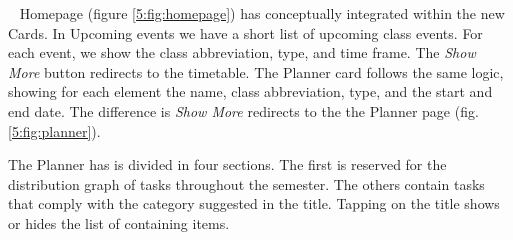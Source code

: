 ~
Homepage (figure \ref{5:fig:homepage}) has conceptually integrated within the new Cards. In Upcoming events we have a short list of upcoming class events. For each event, we show the class abbreviation, type, and time frame. The \textit{Show More} button redirects to the timetable.
The Planner card follows the same logic, showing for each element the name, class abbreviation, type, and the start and end date. The difference is \textit{Show More} redirects to the the Planner page (fig. \ref{5:fig:planner}).

The Planner has is divided in four sections. The first is reserved for the distribution graph of tasks throughout the semester. The others contain tasks that comply with the category suggested in the title. Tapping on the title shows or hides the list of containing items.
~
\begin{figure}[!ht]
    \centering
    \begin{minipage}[b]{0.43\textwidth}
        \captionsetup{justification=centering}

\end{minipage}
\end{figure}
